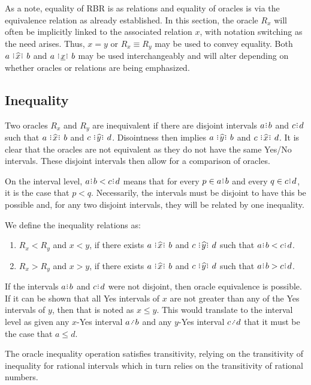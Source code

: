 \documentclass[12pt]{article}
\begin{document}
As a note, equality of RBR is as relations and equality of oracles is via the equivalence relation as already established. In this section, the oracle $R_x$ will often be implicitly linked to the associated relation $x$, with notation switching as the need arises. Thus, $x = y$ or $R_x \equiv R_y$ may be used to convey equality. Both $a \xora b$ and $a \xrel b$ may be used interchangeably and will alter depending on whether oracles or relations are being emphasized. 

\subsection{Inequality}

Two oracles $R_x$ and $R_y$ are inequivalent if there are disjoint intervals $a\rint b$ and $c\rint d$ such that $a \xora b$ and $c \xora[y] d$. Disointness then implies \sout{$a \xora[y] b$} and \sout{$c \xora d$}. It is clear that the oracles are not equivalent as they do not have the same Yes/No intervals. These disjoint intervals then allow for a comparison of oracles. 

On the interval level, $a\rint b < c\rint d$ means that for every $p \in a\rint b$ and every $q \in c\rint d$, it is the case that $p < q$. Necessarily, the intervals must be disjoint to have this be possible and, for any two disjoint intervals, they will be related by one inequality. 

We define the inequality relations as: 
\begin{enumerate}
    \item $R_x < R_y$ and $x < y$, if there exists $a \xora b$ and $c \xora[y] d$ such that $a\rint b<c\rint d$.
    \item $R_x > R_y$ and $x > y$, if there exists $a \xora b$ and $c \xora[y] d$ such that $a\rint b > c\rint d$.
\end{enumerate}

If the intervals $a\rint b$ and $c\rint d$ were not disjoint, then oracle equivalence is possible. If it can be shown that all Yes intervals of $x$ are not greater than any of the Yes intervals of $y$, then that is noted as $x \leq y$. This would translate to the interval level as given any $x$-Yes interval $a \lte b$ and any $y$-Yes interval $c \lte d$ that it must be the case that $a \leq d$. 

The oracle inequality operation satisfies transitivity, relying on the transitivity of inequality for rational intervals which in turn relies on the transitivity of rational numbers. 
\end{document}
